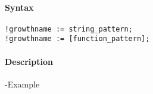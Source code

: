 


	\paragraph{Syntax}

\begin{verbatim}
!growthname := string_pattern;
!growthname := [function_pattern];
\end{verbatim}

\paragraph{Description}

-Example


